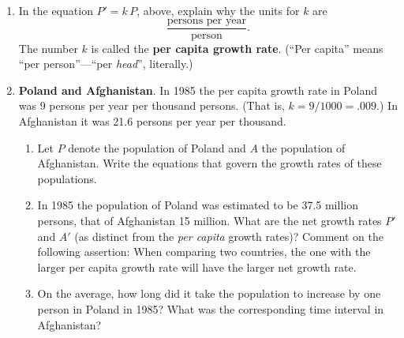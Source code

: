 \begin{enumerate}
\begin{enumerate}
  \item At what rate is the distance increasing after 1 second? After 2
seconds?  After 3 seconds?

  \item Is $d$ a linear function of $t$?  Explain your answer.



In many cases, the rate of change of a variable quantity is
proportional to the quantity itself.  Consider a human population as
an example.  If a city of 100,000 is increasing at the rate of 1500
persons per year, we would expect a similar city of 200,000 to be
increasing at the rate of 3000 persons per year.  That is, if $P$ is
the population at time $t$, then the {\bf net growth
  rate} $P'$ is proportional to $P$:
\[
P' = k\, P.
\]
In the case of the two cities, we have
\[
P' = 1500 = k\, P = k \times 100000 \quad 
		\mbox{so} \quad k =
		\dfrac{1500}{100000} = .015.
\]


\end{enumerate}
\item In the equation $P' = k\, P$, above, explain why the units for
$k$ are
\[
\dfrac{\text{persons per year}}{\text{person}}.
\]
The number $k$ is called the {\bf per capita growth
  rate}. (``Per capita'' means ``per
person''---``per {\em head\/}'', literally.)


\item {\bf Poland and Afghanistan}.\label{Poland} In
1985 the per capita growth rate in Poland was 9 persons per year per
thousand persons.  (That is, $k = 9/1000 = .009$.)  In Afghanistan it
was 21.6 persons per year per thousand.

  \begin{enumerate}
  \item Let $P$ denote the population of Poland and $A$ the population of
Afghanistan.  Write the equations that govern the growth rates of
these populations.

  \item In 1985 the population of Poland was estimated to be 37.5 million
persons, that of Afghanistan 15 million.  What are the net growth
rates $P'$ and $A'$ (as distinct from the {\em per capita\/} growth
rates)?  Comment on the following assertion: When comparing two
countries, the one with the larger per capita growth rate will have
the larger net growth rate.

  \item On the average, how long did it take the population to increase
by one person in Poland in 1985?  What was the corresponding time
interval in Afghanistan?




\end{enumerate}
\end{enumerate}
